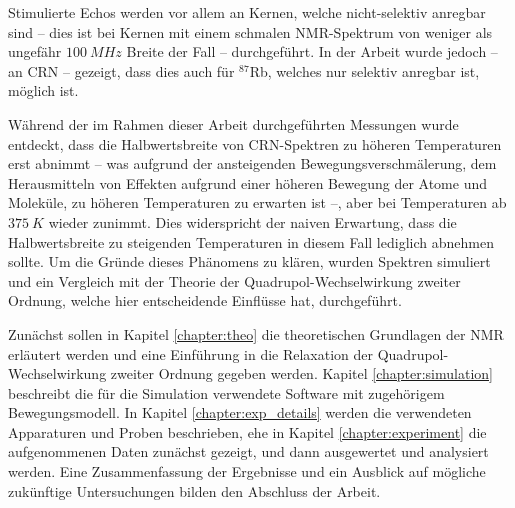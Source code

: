 Stimulierte Echos werden vor allem an Kernen, welche nicht-selektiv anregbar sind -- dies ist bei Kernen mit einem schmalen NMR-Spektrum von weniger als ungefähr $\SI{100}{MHz}$ Breite der Fall -- durchgeführt. In der Arbeit \cite{joachim_master} wurde jedoch -- an CRN -- gezeigt, dass dies auch für $^\text{87}$Rb, welches nur selektiv anregbar ist, möglich ist.

Während der im Rahmen dieser Arbeit durchgeführten Messungen wurde entdeckt, dass die Halbwertsbreite von CRN-Spektren zu höheren Temperaturen erst abnimmt -- was aufgrund der ansteigenden Bewegungsverschmälerung, dem Herausmitteln von Effekten aufgrund einer höheren Bewegung der Atome und Moleküle, zu höheren Temperaturen zu erwarten ist --, aber bei Temperaturen ab $\SI{375}{K}$ wieder zunimmt. Dies widerspricht der naiven Erwartung, dass die Halbwertsbreite zu steigenden Temperaturen in diesem Fall lediglich abnehmen sollte. Um die Gründe dieses Phänomens zu klären, wurden Spektren simuliert und ein Vergleich mit der Theorie der Quadrupol-Wechselwirkung zweiter Ordnung, welche hier entscheidende Einflüsse hat, durchgeführt.

Zunächst sollen in Kapitel \ref{chapter:theo} die theoretischen Grundlagen der NMR erläutert werden und eine Einführung in die Relaxation der Quadrupol-Wechselwirkung zweiter Ordnung gegeben werden. Kapitel \ref{chapter:simulation} beschreibt die für die Simulation verwendete Software mit zugehörigem Bewegungsmodell. In Kapitel \ref{chapter:exp_details} werden die verwendeten Apparaturen und Proben beschrieben, ehe in Kapitel \ref{chapter:experiment} die aufgenommenen Daten zunächst gezeigt, und dann ausgewertet und analysiert werden. Eine Zusammenfassung der Ergebnisse und ein Ausblick auf mögliche zukünftige Untersuchungen bilden den Abschluss der Arbeit.


